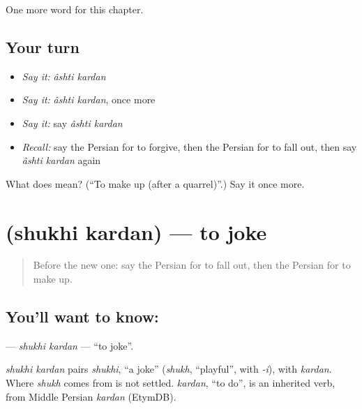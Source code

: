 \begin{grammarlens}[title={What you've built}]
One more word for this chapter.
\end{grammarlens}

\subsection*{Your turn}
\begin{itemize}
\raggedright
  \item \emph{Say it:} \emph{âshti kardan}
  \item \emph{Say it:} \emph{âshti kardan}, once more
  \item \emph{Say it:} say \emph{âshti kardan}
  \item \emph{Recall:} say the Persian for to forgive, then the Persian for to fall out, then say \emph{âshti kardan} again
\end{itemize}

\begin{tcolorbox}[breakable,colback=teal!4,colframe=teal!35!black,title={Before you move on}]
What does   mean? (\textquotedblleft{}To make up (after a quarrel)\textquotedblright{}.) Say it once more.
\end{tcolorbox}
\section[\texorpdfstring{\fa{شوخی} \fa{کردن} (shukhi kardan)}{شوخی کردن (shukhi kardan)}]{  (shukhi kardan) — to joke}

\label{lesson:FA-C221-shukhi-kardan}



\begin{quote}
Before the new one: say the Persian for to fall out, then the Persian for to make up.
\end{quote}

\subsection*{You'll want to know:  }
\textbf{ } — \emph{shukhi kardan} — \textquotedblleft{}to joke\textquotedblright{}.

\begin{cousinweb}
\emph{shukhi kardan} pairs \emph{shukhi}, \textquotedblleft{}a joke\textquotedblright{} (\emph{shukh}, \textquotedblleft{}playful\textquotedblright{}, with \emph{-i}), with \emph{kardan}. Where \emph{shukh} comes from is not settled. \emph{kardan}, \textquotedblleft{}to do\textquotedblright{}, is an inherited verb, from Middle Persian \emph{kardan} (EtymDB).
\end{cousinweb}

